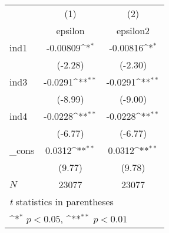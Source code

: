 {
\def\sym#1{\ifmmode^{#1}\else\(^{#1}\)\fi}
\begin{tabular}{l*{2}{c}}
\hline\hline
            &\multicolumn{1}{c}{(1)}&\multicolumn{1}{c}{(2)}\\
            &\multicolumn{1}{c}{epsilon}&\multicolumn{1}{c}{epsilon2}\\
\hline
ind1        &    -0.00809\sym{*} &    -0.00816\sym{*} \\
            &     (-2.28)        &     (-2.30)        \\
[1em]
ind3        &     -0.0291\sym{**}&     -0.0291\sym{**}\\
            &     (-8.99)        &     (-9.00)        \\
[1em]
ind4        &     -0.0228\sym{**}&     -0.0228\sym{**}\\
            &     (-6.77)        &     (-6.77)        \\
[1em]
\_cons      &      0.0312\sym{**}&      0.0312\sym{**}\\
            &      (9.77)        &      (9.78)        \\
\hline
\(N\)       &       23077        &       23077        \\
\hline\hline
\multicolumn{3}{l}{\footnotesize \textit{t} statistics in parentheses}\\
\multicolumn{3}{l}{\footnotesize \sym{*} \(p<0.05\), \sym{**} \(p<0.01\)}\\
\end{tabular}
}

